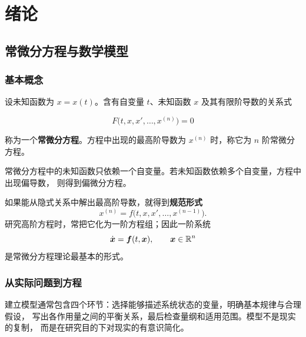 
\chapter{绪论}


\section{常微分方程与数学模型}

\subsection*{基本概念}

\begin{definition}
设未知函数为 $x=x(t)$。含有自变量 $t$、未知函数 $x$ 及其有限阶导数的关系式

	\[ F\bigl(t,x,x',\ldots,x^{(n)}\bigr)=0 \]

称为一个\textbf{常微分方程}。方程中出现的最高阶导数为 $x^{(n)}$ 时，称它为
$n$ 阶常微分方程。
\end{definition}

常微分方程中的未知函数只依赖一个自变量。若未知函数依赖多个自变量，方程中出现偏导数，
则得到偏微分方程。

如果能从隐式关系中解出最高阶导数，就得到\textbf{规范形式}
\[
	x^{(n)}=f\bigl(t,x,x',\ldots,x^{(n-1)}\bigr).
\]
研究高阶方程时，常把它化为一阶方程组；因此一阶系统
\begin{equation}\label{eq:first-order-system}
	\dot{\boldsymbol{x}}=\boldsymbol{f}(t,\boldsymbol{x}),\qquad \boldsymbol{x}\in\mathbb{R}^n
\end{equation}
是常微分方程理论最基本的形式。

\subsection*{从实际问题到方程}

建立模型通常包含四个环节：选择能够描述系统状态的变量，明确基本规律与合理假设，
写出各作用量之间的平衡关系，最后检查量纲和适用范围。模型不是现实的复制，
而是在研究目的下对现实的有意识简化。


